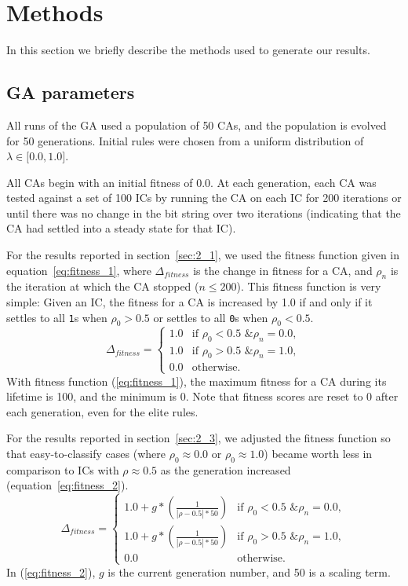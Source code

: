 
\section{Methods} \label{sec:methods}

In this section we briefly describe the methods used to generate our results.

\subsection{GA parameters}

All runs of the GA used a population of 50 CAs, and the population is evolved for 50 generations. 
Initial rules were chosen from a uniform distribution of $\lambda \in \lbrack0.0, 1.0\rbrack$.

All CAs begin with an initial fitness of 0.0. At each generation, each CA was tested against a set of 100 ICs by 
running the CA on each IC for 200 iterations or until there was no change in the bit string over two iterations (indicating that 
the CA had settled into a steady state for that IC). 

For the results reported in section~\ref{sec:2_1}, we used the fitness function given in equation~\ref{eq:fitness_1}, where 
$\Delta_{fitness}$ is the change in fitness for a CA, and $\rho_n$ is the iteration at which the CA stopped ($n \leq 200$). This fitness 
function is very simple: Given an IC, the fitness for a CA is increased by 1.0 if and only if it settles to all \texttt{1}s when $\rho_0 > 0.5$ or 
settles to all \texttt{0}s when $\rho_0 < 0.5$.
\begin{equation} \label{eq:fitness_1}
  \Delta_{fitness} =
  \begin{cases}
    1.0 & \text{if } \rho_0 < 0.5 \text{ \& } \rho_n = 0.0,
    \\
    1.0 & \text{if } \rho_0 > 0.5 \text{ \& } \rho_n = 1.0,
   \\
    0.0 & \text{otherwise}.
  \end{cases}
\end{equation}
With fitness function (\ref{eq:fitness_1}), the maximum fitness for a CA during its lifetime is 100, and the minimum is 0. Note that fitness 
scores are reset to 0 after each generation, even for the elite rules.

For the results reported in section~\ref{sec:2_3}, we adjusted the fitness function so that easy-to-classify cases (where 
$\rho_0 \approx 0.0$ or $\rho_0 \approx 1.0$) became worth less in comparison to ICs with $\rho \approx 0.5$ as the generation 
increased (equation~\ref{eq:fitness_2}).
\begin{equation} \label{eq:fitness_2}
  \Delta_{fitness} =
  \begin{cases}
    1.0 + g*(\frac{1}{|\rho - 0.5| * 50}) & \text{if } \rho_0 < 0.5 \text{ \& } \rho_n = 0.0,
    \\
    1.0 + g*(\frac{1}{|\rho - 0.5| * 50})& \text{if } \rho_0 > 0.5 \text{ \& } \rho_n = 1.0,
   \\
    0.0 & \text{otherwise}.
  \end{cases}
\end{equation}
In (\ref{eq:fitness_2}), $g$ is the current generation number, and 50 is a scaling term.

